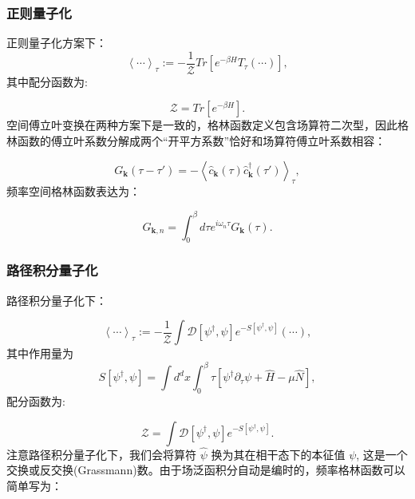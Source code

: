\documentclass[UTF8]{ctexart}
\begin{document}
\subsubsection{正则量子化}

正则量子化方案下：
\begin{equation}
\left\langle \cdots\right\rangle _{\tau}:=-\frac{1}{\mathcal{Z}}Tr\left[e^{-\beta H}T_{\tau}\left(\cdots\right)\right],
\end{equation}
其中配分函数为:

\begin{equation}
\mathcal{Z}=Tr\left[e^{-\beta H}\right].
\end{equation}
空间傅立叶变换在两种方案下是一致的，格林函数定义包含场算符二次型，因此格林函数的傅立叶系数分解成两个“开平方系数”恰好和场算符傅立叶系数相容：

\begin{equation}
G_{\bm{k}}\left(\tau-\tau'\right)=-\left\langle \hat{c}_{\bm{k}}\left(\tau\right)\hat{c}_{\bm{k}}^{\dagger}\left(\tau'\right)\right\rangle _{\tau},
\end{equation}
频率空间格林函数表达为：

\begin{equation}
G_{\bm{k},n}=\int_{0}^{\beta}d\tau e^{i\omega_{n}\tau}G_{\bm{k}}\left(\tau\right).
\end{equation}


\subsubsection{路径积分量子化}

路径积分量子化下：

\begin{equation}
\left\langle \cdots\right\rangle _{\tau}:=-\frac{1}{\mathcal{Z}}\int\mathcal{D}\left[\psi^{\dagger},\psi\right]e^{-S\left[\psi^{\dagger},\psi\right]}\left(\cdots\right),
\end{equation}
其中作用量为
\begin{equation}
S\left[\psi^{\dagger},\psi\right]=\int d^{d}x\int_{0}^{\beta}\tau\left[\psi^{\dagger}\partial_{\tau}\psi+\hat{H}-\mu\hat{N}\right],
\end{equation}
配分函数为:

\begin{equation}
\mathcal{Z}=\int\mathcal{D}\left[\psi^{\dagger},\psi\right]e^{-S\left[\psi^{\dagger},\psi\right]}.
\end{equation}
注意路径积分量子化下，我们会将算符 $\hat{\psi}$ 换为其在相干态下的本征值 $\psi$, 这是一个交换或反交换(Grassmann)数。由于场泛函积分自动是编时的，频率格林函数可以简单写为：
\end{document}

